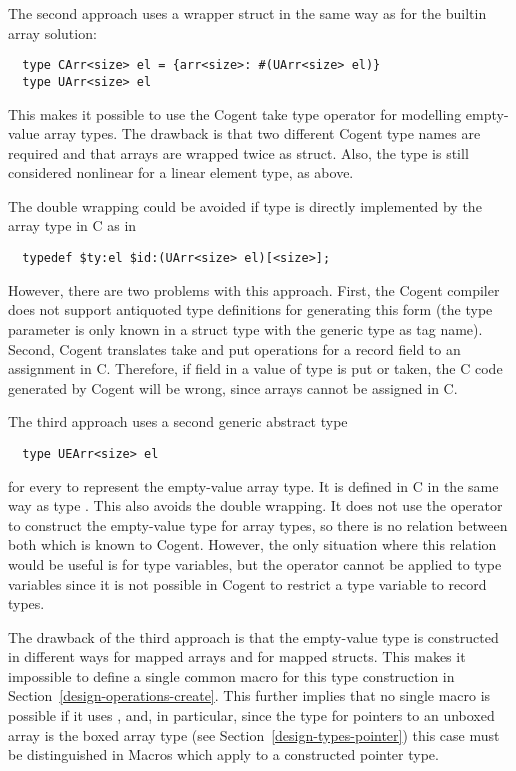 The second approach uses a wrapper struct in the same way as for the builtin array solution:
\begin{verbatim}
  type CArr<size> el = {arr<size>: #(UArr<size> el)}
  type UArr<size> el
\end{verbatim}
This makes it possible to use the Cogent take type operator for modelling empty-value array types.
The drawback is that two different Cogent type names are required and that arrays are wrapped twice as struct.
Also, the type  is still considered nonlinear for a linear element type, as above.

The double wrapping could be avoided if type  is directly implemented by the array type
in C as in
\begin{verbatim}
  typedef $ty:el $id:(UArr<size> el)[<size>];
\end{verbatim}
However, there are two problems with this approach. First, the Cogent compiler does not support antiquoted
type definitions for generating this form (the type parameter  is only known in a struct type
with the generic type as tag name). Second, Cogent translates take and put operations for a record field 
to an assignment in C. Therefore, if field  in a value of type  is put or taken, 
the C code generated by Cogent will be wrong, since arrays cannot be assigned in C. 

The third approach uses a second generic abstract type 
\begin{verbatim}
  type UEArr<size> el
\end{verbatim}
for every  to represent the empty-value array type. It is defined in C in the same way as type .
This also avoids the double wrapping. It does not use the  operator to construct the empty-value type
for array types, so there is no relation between both which is known to Cogent. However, the only situation where this
relation would be useful is for type variables, but the  operator cannot be applied to type variables since
it is not possible in Cogent to restrict a type variable to record types. 

The drawback of the third approach is that the empty-value 
type is constructed in different ways for mapped arrays and for mapped structs. This makes it impossible to define 
a single common macro  for this type construction in Section~\ref{design-operations-create}. This further 
implies that no single macro is possible if it uses , and, in particular, since the type for pointers to
an unboxed array is the boxed array type (see Section~\ref{design-types-pointer}) this case must be distinguished 
in Macros which apply  to a constructed pointer type.


